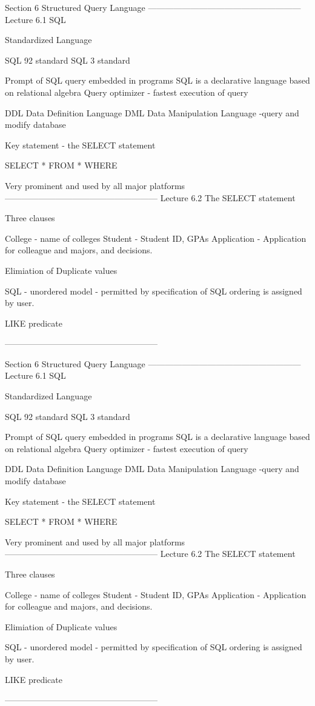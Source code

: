 Section 6 Structured Query Language
------------------------------------------------------
Lecture 6.1 SQL

Standardized Language

SQL 92 standard
SQL 3 standard

Prompt of SQL query
embedded in programs
SQL is a declarative language
based on relational algebra
Query optimizer - fastest execution of query

DDL Data Definition Language
DML Data Manipulation Language -query and modify database

Key statement - the SELECT statement

SELECT * FROM * WHERE

Very prominent and used by all major platforms
------------------------------------------------------
Lecture 6.2 The SELECT statement

Three clauses

College - name of colleges
Student - Student ID, GPAs
Application - Application for colleague and majors, and decisions.

Elimiation of Duplicate values

SQL - unordered model - permitted by specification of SQL
ordering is assigned by user.

LIKE predicate

------------------------------------------------------

Section 6 Structured Query Language
------------------------------------------------------
Lecture 6.1 SQL

Standardized Language

SQL 92 standard
SQL 3 standard

Prompt of SQL query
embedded in programs
SQL is a declarative language
based on relational algebra
Query optimizer - fastest execution of query

DDL Data Definition Language
DML Data Manipulation Language -query and modify database

Key statement - the SELECT statement

SELECT * FROM * WHERE

Very prominent and used by all major platforms
------------------------------------------------------
Lecture 6.2 The SELECT statement

Three clauses

College - name of colleges
Student - Student ID, GPAs
Application - Application for colleague and majors, and decisions.

Elimiation of Duplicate values

SQL - unordered model - permitted by specification of SQL
ordering is assigned by user.

LIKE predicate

------------------------------------------------------
